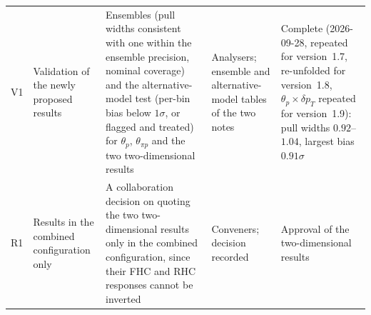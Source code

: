 {\begin{longtable}{@{}p{0.6cm}p{2.5cm}p{5.9cm}p{2.8cm}p{2.4cm}@{}}
\midrule
V1 & Validation of the newly proposed results &
  Ensembles (pull widths consistent with one within the ensemble precision, nominal coverage) and the
  alternative-model test (per-bin bias below $1\sigma$, or flagged and treated) for $\theta_p$,
  $\theta_{\pi p}$ and the two two-dimensional results &
  Analysers; ensemble and alternative-model tables of the two notes & Complete (2026-09-28, repeated for version~1.7, re-unfolded for version~1.8, $\theta_p\times\delta p_T$
  repeated for version~1.9): pull widths $0.92$--$1.04$, largest bias $0.91\sigma$ \\
R1 & Results in the combined configuration only &
  A collaboration decision on quoting the two two-dimensional results only in the combined
  configuration, since their FHC and RHC responses cannot be inverted &
  Conveners; decision recorded & Approval of the two-dimensional results \\
\end{longtable}}
